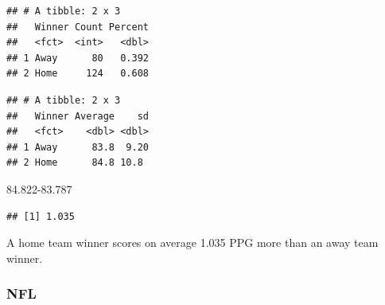 \documentclass[]{article}
\newenvironment{Shaded}{\begin{snugshade}}{\end{snugshade}}
\newcommand{\DataTypeTok}[1]{\textcolor[rgb]{0.13,0.29,0.53}{#1}}
\newcommand{\FloatTok}[1]{\textcolor[rgb]{0.00,0.00,0.81}{#1}}
\newcommand{\KeywordTok}[1]{\textcolor[rgb]{0.13,0.29,0.53}{\textbf{#1}}}
\newcommand{\NormalTok}[1]{#1}
\newcommand{\OperatorTok}[1]{\textcolor[rgb]{0.81,0.36,0.00}{\textbf{#1}}}
\newcommand{\StringTok}[1]{\textcolor[rgb]{0.31,0.60,0.02}{#1}}
\begin{document}
\begin{Shaded}
\end{Shaded}

\begin{verbatim}
## # A tibble: 2 x 3
##   Winner Count Percent
##   <fct>  <int>   <dbl>
## 1 Away      80   0.392
## 2 Home     124   0.608
\end{verbatim}

\begin{Shaded}
\end{Shaded}

\begin{verbatim}
## # A tibble: 2 x 3
##   Winner Average    sd
##   <fct>    <dbl> <dbl>
## 1 Away      83.8  9.20
## 2 Home      84.8 10.8
\end{verbatim}

\begin{Shaded}
\begin{Highlighting}[]
\FloatTok{84.822-83.787}
\end{Highlighting}
\end{Shaded}

\begin{verbatim}
## [1] 1.035
\end{verbatim}

A home team winner scores on average 1.035 PPG more than an away team
winner.

\hypertarget{nfl}{%
\subsubsection{NFL}\label{nfl}}
\end{document}
